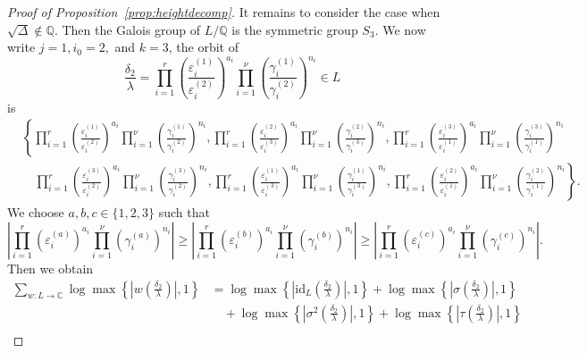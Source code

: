 \begin{proof}[Proof of Proposition~\ref{prop:heightdecomp}]
It remains to consider the case when $\sqrt{\Delta} \notin \mathbb{Q}$. Then the Galois group of $L/\mathbb{Q}$ is the symmetric group $S_3$. We now write $j = 1, i_0 = 2,$ and $k = 3$, the orbit of 
\[\frac{\delta_2}{\lambda}= \prod_{i = 1}^{r}\left( \frac{\varepsilon_i^{(1)}}{\varepsilon_i^{(2)}}\right)^{a_i} \prod_{i = 1}^{\nu} \left( \frac{\gamma_i^{(1)}}{\gamma_i^{(2)}}\right)^{n_i}\in L\]
is
\begin{align*}
& \left\{ \prod_{i = 1}^{r}\left( \frac{\varepsilon_i^{(1)}}{\varepsilon_i^{(2)}}\right)^{a_i} \prod_{i = 1}^{\nu} \left( \frac{\gamma_i^{(1)}}{\gamma_i^{(2)}}\right)^{n_i} , 
	\prod_{i = 1}^{r}\left( \frac{\varepsilon_i^{(2)}}{\varepsilon_i^{(3)}}\right)^{a_i} \prod_{i = 1}^{\nu} \left( \frac{\gamma_i^{(2)}}{\gamma_i^{(3)}}\right)^{n_i}, 
	\prod_{i = 1}^{r}\left( \frac{\varepsilon_i^{(3)}}{\varepsilon_i^{(1)}}\right)^{a_i} \prod_{i = 1}^{\nu} \left( \frac{\gamma_i^{(3)}}{\gamma_i^{(1)}}\right)^{n_i} \right. \\
	& \quad \left. \prod_{i = 1}^{r}\left( \frac{\varepsilon_i^{(3)}}{\varepsilon_i^{(2)}}\right)^{a_i} \prod_{i = 1}^{\nu} \left( \frac{\gamma_i^{(3)}}{\gamma_i^{(2)}}\right)^{n_i} , 
	\prod_{i = 1}^{r}\left( \frac{\varepsilon_i^{(1)}}{\varepsilon_i^{(3)}}\right)^{a_i} \prod_{i = 1}^{\nu} \left( \frac{\gamma_i^{(1)}}{\gamma_i^{(3)}}\right)^{n_i}, 
	\prod_{i = 1}^{r}\left( \frac{\varepsilon_i^{(2)}}{\varepsilon_i^{(1)}}\right)^{a_i} \prod_{i = 1}^{\nu} \left( \frac{\gamma_i^{(2)}}{\gamma_i^{(1)}}\right)^{n_i} \right\}.
\end{align*}
We choose $a,b,c\in\{1,2,3\}$ such that 
\[ \left|\prod_{i = 1}^{r}\left( \varepsilon_i^{(a)}\right)^{a_i} \prod_{i = 1}^{\nu} \left( \gamma_i^{(a)}\right)^{n_i}\right| \geq
	\left|\prod_{i = 1}^{r}\left( \varepsilon_i^{(b)}\right)^{a_i} \prod_{i = 1}^{\nu} \left( \gamma_i^{(b)}\right)^{n_i}\right| \geq
	\left|\prod_{i = 1}^{r}\left( \varepsilon_i^{(c)}\right)^{a_i} \prod_{i = 1}^{\nu} \left( \gamma_i^{(c)}\right)^{n_i}\right|.\]
Then we obtain
\begin{align*}
\sum_{w :L \to \mathbb{C}} \log \max \left\{ \left|w\left(\frac{\delta_2}{\lambda}\right)\right|, 1\right\}
	& = \log \max \left\{ \left|\text{id}_L\left(\frac{\delta_2}{\lambda}\right)\right|, 1\right\} 
		+ \log \max \left\{ \left|\sigma\left(\frac{\delta_2}{\lambda}\right)\right|,1\right\} \\
		& \quad+ \log \max \left\{ \left|\sigma^2\left(\frac{\delta_2}{\lambda}\right)\right|, 1\right\} + \log \max \left\{ \left|\tau\left(\frac{\delta_2}{\lambda}\right)\right|, 1\right\}\\

\end{align*}
\end{proof}

